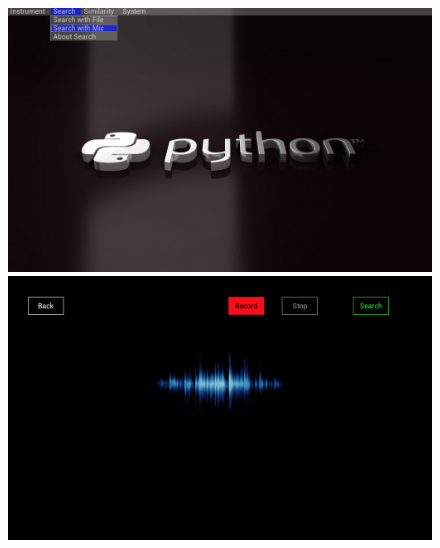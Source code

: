 \documentclass[whitelogo,12pt]{tudelft-report}
\begin{document}
\begin{figure}[!htb]
  \includegraphics[width=\linewidth]{sm1}
\endminipage\hfill
{}
  \includegraphics[width=\linewidth]{sm2}
\endminipage\hfill\\


\end{figure}
\end{document}
